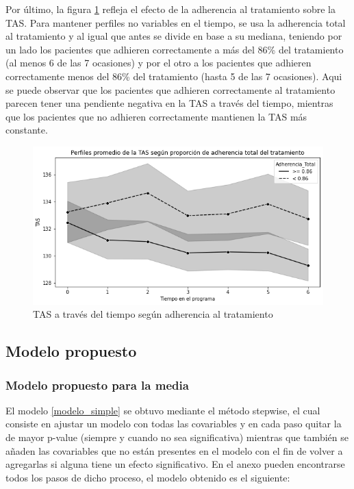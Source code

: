 \documentclass[spanish]{article}
\numberwithin{figure}{subsection}
\numberwithin{equation}{subsection}
\numberwithin{table}{subsection}
\begin{document}
Por último, la figura \ref{TAS_with_adh} refleja el efecto de la adherencia al
tratamiento sobre la TAS. Para mantener perfiles no variables en el tiempo, se
usa la adherencia total al tratamiento y al igual que antes se divide en base a
su mediana, teniendo por un lado los pacientes que adhieren correctamente a más
del 86\% del tratamiento (al menos 6 de las 7 ocasiones) y por el otro a los
pacientes que adhieren correctamente menos del 86\% del tratamiento (hasta 5 de
las 7 ocasiones). Aqui se puede observar que los pacientes que adhieren
correctamente al tratamiento parecen tener una pendiente negativa en la TAS a
través del tiempo, mientras que los pacientes que no adhieren correctamente
mantienen la TAS más constante.

\begin{figure}[H]
	\centering
	\includegraphics[scale=0.5]{img/TAS_vs_tpo_with_adherencia.png}
	\caption{TAS a través del tiempo según adherencia al tratamiento}
	\label{TAS_with_adh}
\end{figure}

\subsection{Modelo propuesto}

\subsubsection{Modelo propuesto para la media}

El modelo \ref{modelo_simple} se obtuvo mediante el método stepwise, el cual
consiste en ajustar un modelo con todas las covariables y en cada paso quitar la
de mayor p-value (siempre y cuando no sea significativa) mientras que también se
añaden las covariables que no están presentes en el modelo con el fin de volver
a agregarlas si alguna tiene un efecto significativo. En el anexo pueden
encontrarse todos los pasos de dicho proceso, el modelo obtenido es el
siguiente:
\end{document}
